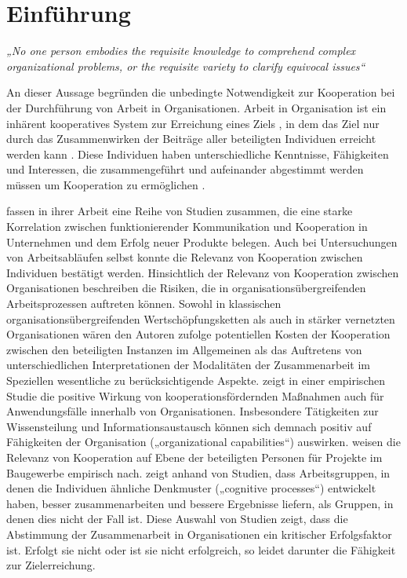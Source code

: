\chapter{Einführung} %
\label{cha:einführung}

\emph{„No one person embodies the requisite knowledge to comprehend complex organizational problems, or the requisite variety to clarify equivocal issues“} \citep{Tyre97}

An dieser Aussage begründen \citeauthor{Tyre97} die unbedingte Notwendigkeit zur Kooperation bei der Durchführung von Arbeit in Organisationen. Arbeit in Organisation ist ein inhärent kooperatives System \citep{Helmberger62} zur Erreichung eines Ziels \citep{Semmer04}, in dem das Ziel nur durch das Zusammenwirken der Beiträge aller beteiligten Individuen erreicht werden kann \citep{Strauss85} \citep{Tyre97}. Diese Individuen haben unterschiedliche Kenntnisse, Fähigkeiten und Interessen, die zusammengeführt und aufeinander abgestimmt werden müssen um Kooperation zu ermöglichen \citep{Schmidt94}.

\citet{Griffin92} fassen in ihrer Arbeit eine Reihe von Studien zusammen, die eine starke Korrelation zwischen funktionierender Kommunikation und Kooperation in Unternehmen und dem Erfolg neuer Produkte belegen. Auch bei Untersuchungen von Arbeitsabläufen selbst konnte die Relevanz von Kooperation zwischen Individuen bestätigt werden. Hinsichtlich der Relevanz von Kooperation zwischen Organisationen beschreiben \citet{Kumar96} die Risiken, die in organisationsübergreifenden Arbeitsprozessen auftreten können. Sowohl in klassischen organisationsübergreifenden Wertschöpfungsketten als auch in stärker vernetzten Organisationen wären den Autoren zufolge potentiellen Kosten der Kooperation zwischen den beteiligten Instanzen im Allgemeinen als das Auftretens von unterschiedlichen Interpretationen der Modalitäten der Zusammenarbeit im Speziellen wesentliche zu berücksichtigende Aspekte. \citet{Tsai02} zeigt in einer empirischen Studie die positive Wirkung von kooperationsfördernden Maßnahmen auch für Anwendungsfälle innerhalb von Organisationen. Insbesondere Tätigkeiten zur Wissensteilung und Informationsaustausch können sich demnach positiv auf Fähigkeiten der Organisation („organizational capabilities“) auswirken. \citet{Phua04} weisen die Relevanz von Kooperation auf Ebene der beteiligten Personen für Projekte im Baugewerbe empirisch nach. \citet{Roy01} zeigt anhand von Studien, dass Arbeitsgruppen, in denen die Individuen ähnliche Denkmuster („cognitive processes“) entwickelt haben, besser zusammenarbeiten und bessere Ergebnisse liefern, als Gruppen, in denen dies nicht der Fall ist. Diese Auswahl von Studien zeigt, dass die Abstimmung der Zusammenarbeit in Organisationen ein kritischer Erfolgsfaktor ist. Erfolgt sie nicht oder ist sie nicht erfolgreich, so leidet darunter die Fähigkeit zur Zielerreichung.

